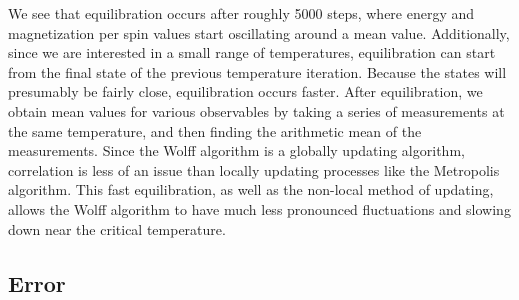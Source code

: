 \documentclass[twocolumn,aps,prl]{revtex4-1} %
\begin{document}
We see that equilibration occurs after roughly 5000 steps, where energy and magnetization per spin values start oscillating around a mean value. Additionally, since we are interested in a small range of temperatures, equilibration can start from the final state of the previous temperature iteration. Because the states will presumably be fairly close, equilibration occurs faster. After equilibration, we obtain mean values for various observables by taking a series of measurements at the same temperature, and then finding the arithmetic mean of the measurements. Since the Wolff algorithm is a globally updating algorithm, correlation is less of an issue than locally updating processes like the Metropolis algorithm. This fast equilibration, as well as the non-local method of updating, allows the Wolff algorithm to have much less pronounced fluctuations and slowing down near the critical temperature. 

\subsection{Error}
\end{document}
